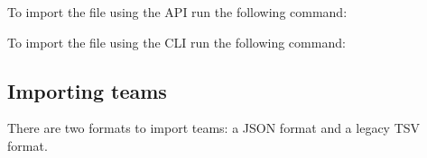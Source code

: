 \documentclass[a4paper,10pt,english,openany]{sphinxmanual}
\begin{document}
\sphinxAtStartPar
To import the file using the API run the following command:

\begin{sphinxVerbatim}[commandchars=\\\{\}]
      
\end{sphinxVerbatim}

\sphinxAtStartPar
To import the file using the CLI run the following command:

\begin{sphinxVerbatim}[commandchars=\\\{\}]
      
\end{sphinxVerbatim}


\subsection{Importing teams}
\label{\detokenize{import:importing-teams}}
\sphinxAtStartPar
There are two formats to import teams: a JSON format and a legacy TSV format.
\end{document}
